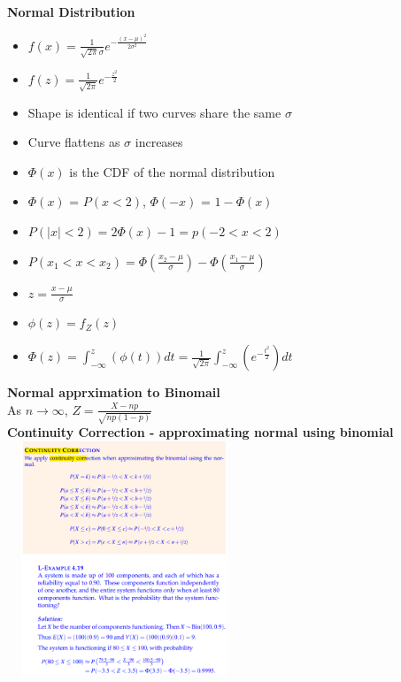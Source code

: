 \documentclass[10pt, landscape]{article}
\begin{document}
\begin{multicols}{4}
\textbf{Normal Distribution} \newline
\begin{itemize}
  \item $f(x)=\frac{1}{\sqrt{2\pi}\sigma}e^{-\frac{(x-\mu)^2}{2\sigma^2}}$
  \item $f(z) = \frac{1}{\sqrt{2\pi}}e^{-\frac{z^2}{2}}$
  \item Shape is identical if two curves share the same $\sigma$
  \item Curve flattens as $\sigma$ increases
  \item $\Phi(x)$ is the CDF of the normal distribution
  \item $\Phi(x)$ = $P(x<2)$, $\Phi(-x)$ = $1-\Phi(x)$
  \item $P(|x|<2) = 2\Phi(x)-1 = p(-2<x<2)$
  \item $P(x_1<x<x_2)=\Phi(\frac{x_2-\mu}{\sigma})-\Phi(\frac{x_1-\mu}{\sigma})$
  \item $z=\frac{x-\mu}{\sigma}$
  \item $\phi(z)=f_Z(z)$
  \item $\Phi(z)=\int_{-\infty}^{z}(\phi(t))dt=\frac{1}{\sqrt{2\pi}}\int_{-\infty}^{z}(e^{-\frac{t^2}{2}})dt$
\end{itemize}

\textbf{Normal apprximation to Binomail} \\
As $n \rightarrow \infty$, $Z = \frac{X-np}{\sqrt{np(1-p)}}$ \\ 

\textbf{Continuity Correction - approximating normal using binomial} \\ 
\includegraphics[width=7cm, height=7cm]{continuity.png}



\end{multicols}
\end{document}
